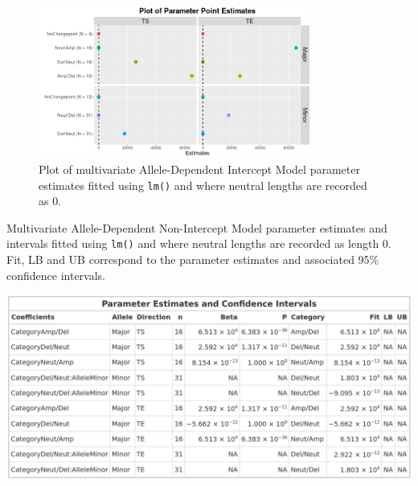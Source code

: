 \begin{figure}[!h]
\centering
\includegraphics[width = 0.8\textwidth]{../figures/Chapter_5/Multivariate_lm_7_AD_Interval.png}
 
\caption[Plot of multivariate Allele-Dependent Intercept Model parameter estimates fitted using \texttt{lm()}.]{Plot of multivariate Allele-Dependent Intercept Model parameter estimates fitted using \texttt{lm()} and where neutral lengths are recorded as 0. }
\label{fig:lm_multi_AD_modpred}
\end{figure}

\begin{table}[!h]
\centering
\caption[Multivariate Allele-Dependent Non-Intercept Model parameter estimates and intervals fitted using \texttt{lm()}.]{Multivariate Allele-Dependent Non-Intercept Model parameter estimates and intervals fitted using \texttt{lm()} and where neutral lengths are recorded as length 0. Fit, LB and UB correspond to the parameter estimates and associated 95\% confidence intervals. }

\includegraphics[width = 1\textwidth]{../tables/Chapter_5/Multivariate_lm_6_AD_Model_Pred.png}
\label{tab:lm_multi_AD_modpred_6}
\end{table}
\clearpage

